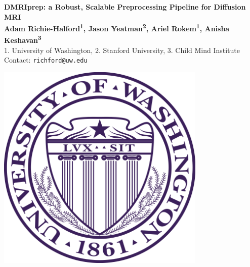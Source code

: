 \documentclass[a0, landscape]{a0poster}
\begin{document}


\begin{minipage}[b]{0.88\linewidth}
\veryHuge \color{NavyBlue} \textbf{DMRIprep: a Robust, Scalable Preprocessing Pipeline for Diffusion MRI} \color{Black}\\ %
\huge \textbf{Adam Richie-Halford\textsuperscript{1}, Jason Yeatman\textsuperscript{2}, Ariel Rokem\textsuperscript{1}, Anisha Keshavan\textsuperscript{3}}\\ %
\Large 1. University of Washington, 2. Stanford University, 3. Child Mind Institute \\ %
\Large Contact: \texttt{richford@uw.edu}
\end{minipage}
%
%
\begin{minipage}[b]{0.19\linewidth}
\includegraphics[width=10cm]{UWlogo.png}
\end{minipage}
\end{document}
